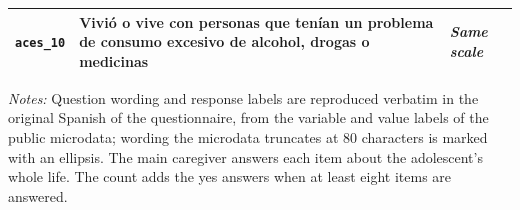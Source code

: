 \begin{table}[htbp]
\begin{threeparttable}
\begin{tabular}{@{}p{68pt}p{212pt}p{150pt}@{}}
\addlinespace[1pt]
\texttt{aces\_10} & Vivió o vive con personas que tenían un problema de consumo excesivo de alcohol, drogas o medicinas & \textit{Same scale} \\
\bottomrule
\end{tabular}
\begin{wpnotes}
\textit{Notes:} Question wording and response labels are reproduced verbatim in the original Spanish of the questionnaire, from the variable and value labels of the public microdata; wording the microdata truncates at 80 characters is marked with an ellipsis. The main caregiver answers each item about the adolescent's whole life. The count adds the yes answers when at least eight items are answered.
\end{wpnotes}
\end{threeparttable}
\end{table}
